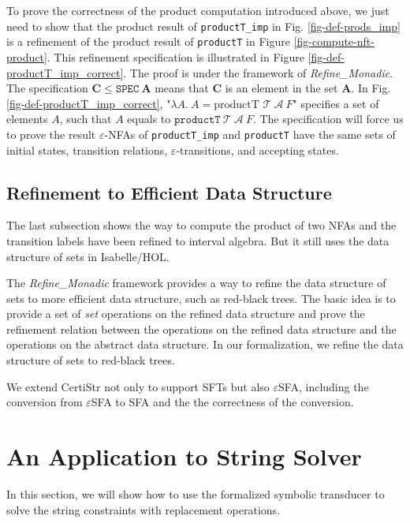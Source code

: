 \documentclass[a4paper,UKenglish,cleveref, autoref, thm-restate]{lipics-v2021}
\begin{document}
  To prove the correctness of the product computation introduced above, we just need to show that the product result of \texttt{productT\_imp} in Fig. \ref{fig-def-prods_imp} is a refinement of the product result of \texttt{productT} in Figure \ref{fig-compute-nft-product}. This refinement specification is illustrated in Figure \ref{fig-def-productT_imp_correct}. The proof is under the framework of \emph{Refine\_Monadic}. The specification $\mathbf{C} \leq\texttt{SPEC}~\mathbf{A}$ means that $\mathbf{C}$ is an element in the set $\mathbf{A}$. In Fig. \ref{fig-def-productT_imp_correct}, "$\lambda A.~A = \text{productT } \mathcal{T}~\mathcal{A}~F$" specifies a set of elements $A$, such that $A$ equals to $\texttt{productT}~\mathcal{T}~\mathcal{A}~F$. 
  The specification will force us to prove the result $\varepsilon$-NFAs of \texttt{productT\_imp}  and \texttt{productT} have the same sets of initial states, transition relations, $\varepsilon$-transitions, and accepting states.

\subsection{Refinement to Efficient Data Structure}

The last subsection shows the way to compute the product of two NFAs and the transition labels have been refined to interval algebra. But it still uses the data structure of sets in Isabelle/HOL. 

The \emph{Refine\_Monadic} framework provides a way to refine the data structure of sets to more efficient data structure, such as red-black trees. The basic idea is to provide a set of \emph{set} operations on the refined data structure and prove the refinement relation between the operations on the refined data structure and the operations on the abstract data structure.
%
In our formalization, we refine the data structure of sets to red-black trees.

We extend CertiStr \cite{cpp/KanLRS22} not only to support SFTs but also $\varepsilon$SFA, including the conversion from $\varepsilon$SFA to SFA and the the correctness of the conversion. 







\section{An Application to String Solver}
\label{sec-app-str-solver}
In this section, we will show how to use the formalized symbolic transducer to solve the string constraints with replacement operations.
\end{document}
